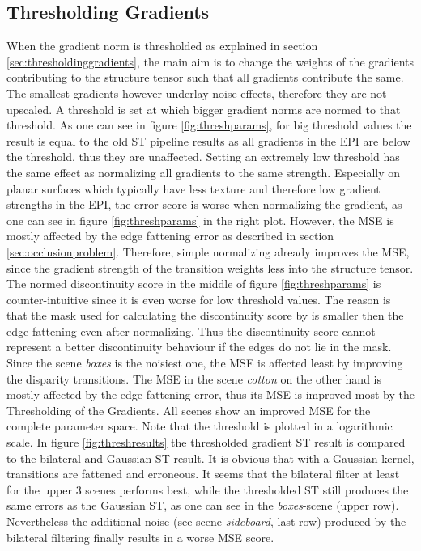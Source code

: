 \documentclass  [
  paper    = a4,
  BCOR     = 10mm,
  twoside,
  fontsize = 12pt,
  fleqn,
  toc      = bibnumbered,
  toc      = listofnumbered,
  numbers  = noendperiod,
  headings = normal,
  listof   = leveldown,
  version  = 3.03
]                                       {scrreprt}
\begin{document}
\subsection{Thresholding Gradients}
\label{sec:ev_thresh}
When the gradient norm is thresholded as explained in section \ref{sec:thresholdinggradients}, the main aim is to change the weights of the gradients contributing to the structure tensor such that all gradients contribute the same. The smallest gradients however underlay noise effects, therefore they are not upscaled. A threshold is set at which bigger gradient norms are normed to that threshold. As one can see in figure \ref{fig:threshparams}, for big threshold values the result is equal to the old ST pipeline results as all gradients in the EPI are below the threshold, thus they are unaffected. Setting an extremely low threshold has the same effect as normalizing all gradients to the same strength. Especially on planar surfaces which typically have less texture and therefore low gradient strengths in the EPI, the error score is worse when normalizing the gradient, as one can see in figure \ref{fig:threshparams} in the right plot. However, the MSE is mostly affected by the edge fattening error as described in section \ref{sec:occlusionproblem}. Therefore, simple normalizing already improves the MSE, since the gradient strength of the transition weights less into the structure tensor. The normed discontinuity score in the middle of figure \ref{fig:threshparams} is counter-intuitive since it is even worse for low threshold values. The reason is that the mask used for calculating the discontinuity score by \cite{honauer2016benchmark} is smaller then the edge fattening even after normalizing. Thus the discontinuity score cannot represent a better discontinuity behaviour if the edges do not lie in the mask. \\
Since the scene \textit{boxes} is the noisiest one, the MSE is affected least by improving the disparity transitions. The MSE in the scene \textit{cotton} on the other hand is mostly affected by the edge fattening error, thus its MSE is improved most by the Thresholding of the Gradients. All scenes show an improved MSE for the complete parameter space. Note that the threshold is plotted in a logarithmic scale. In figure \ref{fig:threshresults} the thresholded gradient ST result is compared to the bilateral and Gaussian ST result. It is obvious that with a Gaussian kernel, transitions are fattened and erroneous. It seems that the bilateral filter at least for the upper 3 scenes performs best, while the thresholded ST still produces the same errors as the Gaussian ST, as one can see in the \textit{boxes}-scene (upper row). Nevertheless the additional noise (see scene \textit{sideboard}, last row) produced by the bilateral filtering finally results in a worse MSE score. 
\end{document}
